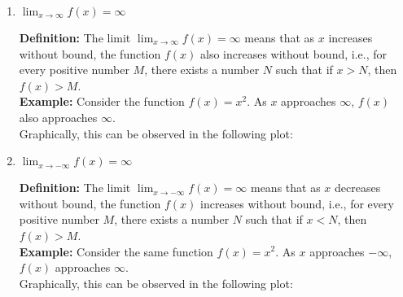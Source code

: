 \documentclass[12pt]{article}
\begin{document}
\begin{enumerate}[label=(\alph*)]

    \item $\lim_{x \to \infty}f(x) = \infty$
    
      \textbf{Definition:} The limit $\lim_{x \to \infty}f(x) = \infty$ means that as $x$ increases without bound, the function $f(x)$ also increases without bound, i.e., for every positive number $M$, there exists a number $N$ such that if $x > N$, then $f(x) > M$.
      \\
      \textbf{Example:} Consider the function $f(x) = x^2$. As $x$ approaches $\infty$, $f(x)$ also approaches $\infty$.
      \\
      Graphically, this can be observed in the following plot:
      
    \item $\lim_{x \to -\infty}f(x) = \infty$
    
      \textbf{Definition:} The limit $\lim_{x \to -\infty}f(x) = \infty$ means that as $x$ decreases without bound, the function $f(x)$ increases without bound, i.e., for every positive number $M$, there exists a number $N$ such that if $x < N$, then $f(x) > M$.
      \\
      \textbf{Example:} Consider the same function $f(x) = x^2$. As $x$ approaches $-\infty$, $f(x)$ approaches $\infty$.
      \\
      Graphically, this can be observed in the following plot:
      

\end{enumerate}
\end{document}
